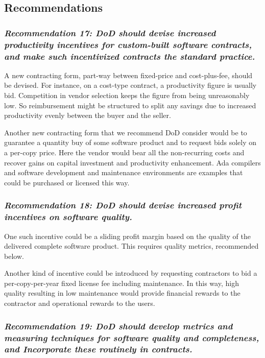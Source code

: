 \documentclass[12pt,final]{article}
\begin{document}
\subsection*{Recommendations}

\subsubsection*{\textit{Recommendation 17: DoD should devise increased productivity incentives
for custom-built software contracts, and make such incentivized contracts the
standard practice.}}

A new contracting form, part-way between fixed-price and cost-plus-fee, should
be devised. For instance, on a cost-type contract, a productivity figure is
usually bid.  Competition in vendor selection keeps the figure from being
unreasonably low. So reimbursement might be structured to split any savings due
to increased productivity evenly between the buyer and the seller.

Another new contracting form that we recommend DoD consider would be to
guarantee a quantity buy of some software product and to request bids solely on
a per-copy price. Here the vendor would bear all the non-recurring costs and
recover gains on capital investment and productivity enhancement. Ada compilers
and software development and maintenance environments are examples that could
be purchased or licensed this way.

\subsubsection*{\textit{Recommendation 18: DoD should devise increased profit incentives on
software quality.}}

One such incentive could be a sliding profit margin based on the quality of the
delivered complete software product. This requires quality metrics, recommended
below.

Another kind of incentive could be introduced by requesting contractors to bid
a per-copy-per-year fixed license fee including maintenance. In this way, high
quality resulting in low maintenance would provide financial rewards to the
contractor and operational rewards to the users.

\subsubsection*{\textit{Recommendation 19: DoD should develop metrics and
measuring techniques for software quality and completeness, and Incorporate
these routinely in contracts.}}
\end{document}
